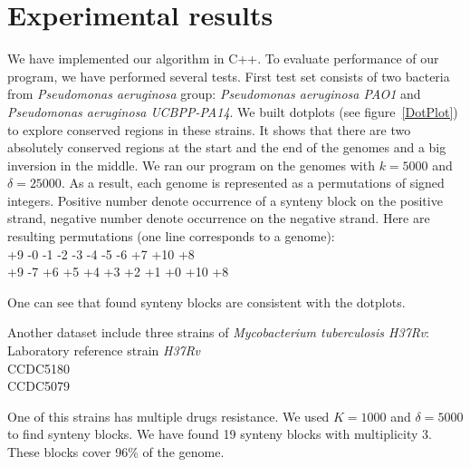 \documentclass[a4paper, 12pt]{scrartcl}
\begin{document}
\section{Experimental results}
We have implemented our algorithm in C++. To evaluate performance of our program, we have performed several tests.
First test set consists of two bacteria from \textit{Pseudomonas aeruginosa} group: \textit{Pseudomonas aeruginosa PAO1} and \textit{Pseudomonas aeruginosa UCBPP-PA14}. We built
dotplots (see figure~\ref{DotPlot}) to explore conserved regions in these strains. It shows that there are two absolutely conserved regions at the start and the end of the genomes and a big
inversion in the middle. We ran our program on the genomes with \(k = 5000\) and \(\delta = 25000\). As a result, each genome is represented as a permutations of signed integers. Positive
number denote occurrence of a synteny block on the positive strand, negative number denote occurrence on the negative strand. Here are resulting permutations (one line corresponds to a
genome): \\
+9 -0 -1 -2 -3 -4 -5 -6 +7 +10 +8 \\
+9 -7 +6 +5 +4 +3 +2 +1 +0 +10 +8

One can see that found synteny blocks are consistent with the dotplots.

Another dataset include three strains of \textit{Mycobacterium tuberculosis H37Rv}: \\
Laboratory reference strain \textit{H37Rv} \\
CCDC5180 \\
CCDC5079

One of this strains has multiple drugs resistance. We used \(K = 1000\) and \(\delta = 5000\) to find synteny blocks. We have found 19 synteny blocks
with multiplicity \(3\). These blocks cover 96\% of the genome.
\end{document}

